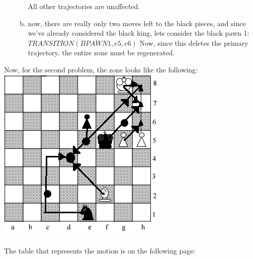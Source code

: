 \documentclass[11pt]{article}
\begin{document}
\begin{enumerate}
\begin{enumerate}[(a)]
All other trajectories are unaffected. \\
\item now, there are really only two moves left to the black pieces, and since we've already considered the black king, lets consider the black pawn 1: $TRANSITION(BPAWN1, e5, e6)$
Now, since this deletes the primary trajectory, the entire zone must be regenerated. 
\end{enumerate}
\end{enumerate}

Now, for the second problem, the zone looks like the following: \\
\includegraphics{P2Zone.png}\\\\


The table that represents the motion is on the following page: 


\end{document}
